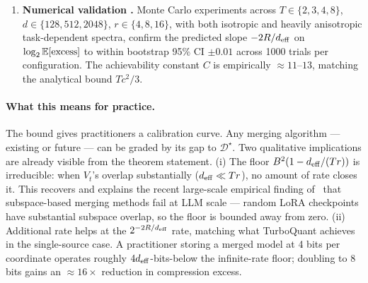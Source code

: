 \begin{enumerate}[leftmargin=*,topsep=2pt,itemsep=2pt]
\item \textbf{Numerical validation .} Monte Carlo experiments across $T\in\{2,3,4,8\}$,
$d\in\{128,512,2048\}$, $r\in\{4,8,16\}$, with both isotropic
and heavily anisotropic task-dependent spectra, confirm the
predicted slope $-2R/d_{\mathrm{eff}}$ on $\log_2\mathbb{E}[\text{excess}]$ to
within bootstrap 95\% CI $\pm 0.01$ across 1000 trials per
configuration. The achievability constant $C$ is empirically
$\approx 11$--$13$, matching the analytical bound $Tc^2/3$.
\end{enumerate}

\paragraph{What this means for practice.} The bound gives
practitioners a calibration curve. Any merging algorithm —
existing or future — can be graded by its gap to
$\mathcal{D}^\star$. Two qualitative implications are already
visible from the theorem statement. (i) The floor
$B^2(1 - d_{\mathrm{eff}}/(Tr))$ is irreducible: when $V_t$'s overlap
substantially ($d_{\mathrm{eff}}\ll Tr$), no amount of rate closes it.
This recovers and explains the recent large-scale empirical
finding of~\cite{systematic2025merging} that subspace-based
merging methods fail at LLM scale — random LoRA checkpoints
have substantial subspace overlap, so the floor is bounded
away from zero. (ii) Additional rate helps at the
$2^{-2R/d_{\mathrm{eff}}}$ rate, matching what TurboQuant achieves in
the single-source case. A practitioner storing a merged
model at 4 bits per coordinate operates roughly
$4d_{\mathrm{eff}}$-bits-below the infinite-rate floor; doubling to
8 bits gains an $\approx 16\times$ reduction in compression
excess.


